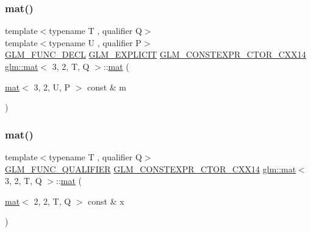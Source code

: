 \mbox{\label{structglm_1_1mat_3_013_00_012_00_01_t_00_01_q_01_4_ad6c2490865785641ce19a850997227ff}} 
\subsubsection{\texorpdfstring{mat()}{mat()}\hspace{0.1cm}{\footnotesize\ttfamily [9/21]}}
{\footnotesize\ttfamily template$<$typename T , qualifier Q$>$ \\
template$<$typename U , qualifier P$>$ \\
\hyperlink{setup_8hpp_ab2d052de21a70539923e9bcbf6e83a51}{G\+L\+M\+\_\+\+F\+U\+N\+C\+\_\+\+D\+E\+CL} \hyperlink{setup_8hpp_a6c74f5a5e7b134ab69023ff9a30d4d5d}{G\+L\+M\+\_\+\+E\+X\+P\+L\+I\+C\+IT} \hyperlink{setup_8hpp_a0900f9145e68bf6061b6f5e7be3fa751}{G\+L\+M\+\_\+\+C\+O\+N\+S\+T\+E\+X\+P\+R\+\_\+\+C\+T\+O\+R\+\_\+\+C\+X\+X14} \hyperlink{structglm_1_1mat}{glm\+::mat}$<$ 3, 2, T, Q $>$\+::\hyperlink{structglm_1_1mat}{mat} (\begin{DoxyParamCaption}\item[{\hyperlink{structglm_1_1mat}{mat}$<$ 3, 2, U, P $>$ const \&}]{m }\end{DoxyParamCaption})}

\mbox{\label{structglm_1_1mat_3_013_00_012_00_01_t_00_01_q_01_4_a25c9c73a24a4e8f13ba8694642a43387}} 
\subsubsection{\texorpdfstring{mat()}{mat()}\hspace{0.1cm}{\footnotesize\ttfamily [10/21]}}
{\footnotesize\ttfamily template$<$typename T , qualifier Q$>$ \\
\hyperlink{setup_8hpp_a33fdea6f91c5f834105f7415e2a64407}{G\+L\+M\+\_\+\+F\+U\+N\+C\+\_\+\+Q\+U\+A\+L\+I\+F\+I\+ER} \hyperlink{setup_8hpp_a0900f9145e68bf6061b6f5e7be3fa751}{G\+L\+M\+\_\+\+C\+O\+N\+S\+T\+E\+X\+P\+R\+\_\+\+C\+T\+O\+R\+\_\+\+C\+X\+X14} \hyperlink{structglm_1_1mat}{glm\+::mat}$<$ 3, 2, T, Q $>$\+::\hyperlink{structglm_1_1mat}{mat} (\begin{DoxyParamCaption}\item[{\hyperlink{structglm_1_1mat}{mat}$<$ 2, 2, T, Q $>$ const \&}]{x }\end{DoxyParamCaption})}

